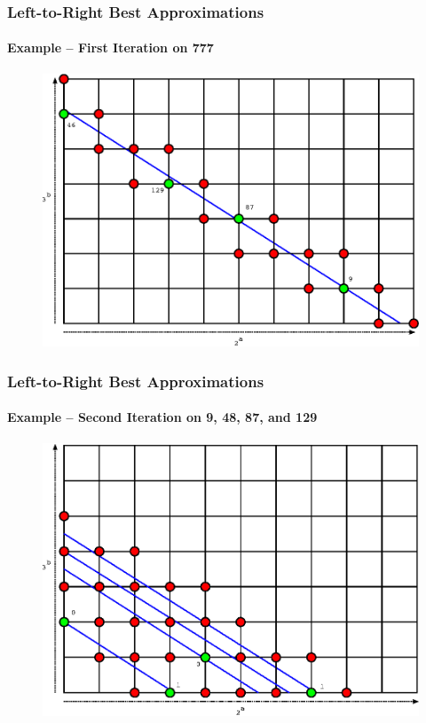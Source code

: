 \documentclass{beamer}
\begin{document}
\begin{frame}
\frametitle{Left-to-Right Best Approximations}
\framesubtitle{Example -- First Iteration on 777}
\begin{figure}
\includegraphics[scale=0.84]{best-approx-777}
\end{figure}
\end{frame}
\begin{frame}
\frametitle{Left-to-Right Best Approximations}
\framesubtitle{Example -- Second Iteration on 9, 48, 87, and 129}
\begin{figure}
\includegraphics[scale=0.84]{best-approx-9-48-87-129}
\end{figure}
\end{frame}
\end{document}
